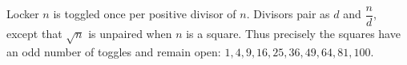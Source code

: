 Locker $n$ is toggled once per positive divisor of $n$. Divisors pair as $d$ and $\dfrac{n}{d}$, except that $\sqrt n$ is unpaired when $n$ is a square. Thus precisely the squares have an odd number of toggles and remain open: $\boxed{1,4,9,16,25,36,49,64,81,100}$.
